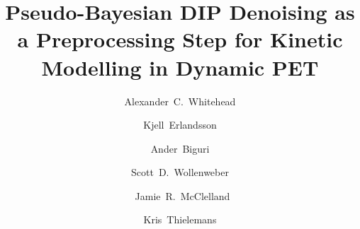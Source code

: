 \documentclass[portrait, color=UCLburgundy, margin=1cm]{uclposter}
\begin{document}
    \title{Pseudo-Bayesian DIP Denoising as a Preprocessing Step for Kinetic Modelling in Dynamic PET}
    
    \author[12*]{Alexander~C.~Whitehead}
    \author[1]{Kjell~Erlandsson}
    \author[3]{Ander~Biguri}
    \author[4]{Scott~D.~Wollenweber}
    \author[2]{\newline~Jamie~R.~McClelland}
    \author[12]{Kris~Thielemans}
    
    
    \maketitle
\end{document}
